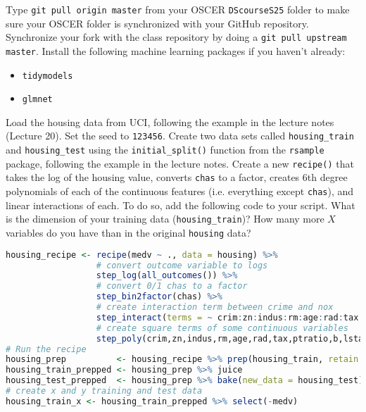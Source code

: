 \documentclass[12pt,english]{exam}
\begin{document}
\begin{questions}
\question Type \texttt{git pull origin master} from your OSCER \texttt{DScourseS25} folder to make sure your OSCER folder is synchronized with your GitHub repository. 
\question Synchronize your fork with the class repository by doing a \texttt{git pull upstream master}.
\question Install the following machine learning packages if you haven't already:
\begin{itemize}
    \item \texttt{tidymodels}
    \item \texttt{glmnet}
\end{itemize}
\question Load the housing data from UCI, following the example in the lecture notes (Lecture 20).
\question Set the seed to \texttt{123456}.
\question Create two data sets called \texttt{housing\_train} and \texttt{housing\_test} using the \texttt{initial\_split()} function from the \texttt{rsample} package, following the example in the lecture notes.
\question Create a new \texttt{recipe()} that takes the log of the housing value, converts \texttt{chas} to a factor, creates 6th degree polynomials of each of the continuous features (i.e. everything except \texttt{chas}), and linear interactions of each. To do so, add the following code to your script. What is the dimension of your training data (\texttt{housing\_train})? How many more $X$ variables do you have than in the original \texttt{housing} data?
\begin{lstlisting}[language=R]
housing_recipe <- recipe(medv ~ ., data = housing) %>%
                  # convert outcome variable to logs
                  step_log(all_outcomes()) %>%
                  # convert 0/1 chas to a factor
                  step_bin2factor(chas) %>%
                  # create interaction term between crime and nox
                  step_interact(terms = ~ crim:zn:indus:rm:age:rad:tax:ptratio:b:lstat:dis:nox) %>%
                  # create square terms of some continuous variables
                  step_poly(crim,zn,indus,rm,age,rad,tax,ptratio,b,lstat,dis,nox, degree=6)
# Run the recipe
housing_prep          <- housing_recipe %>% prep(housing_train, retain = TRUE)
housing_train_prepped <- housing_prep %>% juice
housing_test_prepped  <- housing_prep %>% bake(new_data = housing_test)
# create x and y training and test data
housing_train_x <- housing_train_prepped %>% select(-medv)

\end{lstlisting}
\end{questions}
\end{document}
